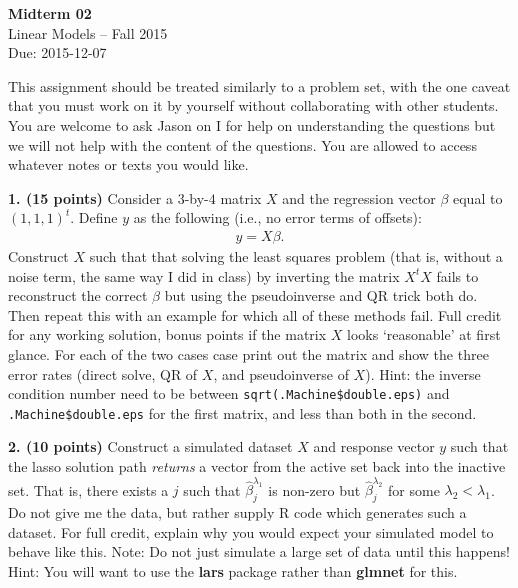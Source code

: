 \documentclass[12pt]{article}
\begin{document}
\begin{center}
{\bf Midterm 02} \\
Linear Models -- Fall 2015 \\
Due: 2015-12-07
\end{center}

\medskip

This assignment should be treated similarly to a problem set, with the one
caveat that you must work on it by yourself without collaborating with other
students. You are welcome to ask Jason on I for help on understanding the
questions but we will not help with the content of the questions. You are allowed
to access whatever notes or texts you would like.

{\bf 1. (15 points)} Consider a $3$-by-$4$ matrix $X$ and the
regression vector $\beta$ equal to $(1, 1, 1)^t$. Define $y$ as the following (i.e., no
error terms of offsets):
\begin{align*}
y = X \beta.
\end{align*}
Construct $X$ such that that solving the least squares
problem (that is, without a noise term, the same way I did in class) by inverting
the matrix $X^t X$ fails to reconstruct the correct $\beta$ but using the pseudoinverse
and QR trick both do. Then repeat this with an example for which all of these methods fail.
Full credit for any working solution, bonus points if the matrix $X$ looks
`reasonable' at first glance. For each of the two cases case print out the matrix and show
the three error rates (direct solve, QR of $X$, and pseudoinverse of $X$). Hint: the inverse
condition number need to be between \texttt{sqrt(.Machine\$double.eps)} and
\texttt{.Machine\$double.eps} for the first matrix, and less than both in the second.

{\bf 2. (10 points)} Construct a simulated dataset $X$ and response vector $y$ such
that the lasso solution path \textit{returns} a vector from the active set back into
the inactive set. That is, there exists a $j$ such that $\widehat{\beta}_j^{\lambda_1}$ is non-zero
but $\widehat{\beta}_j^{\lambda_2}$ for some $\lambda_2 < \lambda_1$. Do not give me the
data, but rather supply R code which generates such a dataset. For full credit, explain
why you would expect your simulated model to behave like this. Note: Do not just simulate
a large set of data until this happens! Hint: You will want to use the \textbf{lars} package
rather than \textbf{glmnet} for this.
\end{document}
